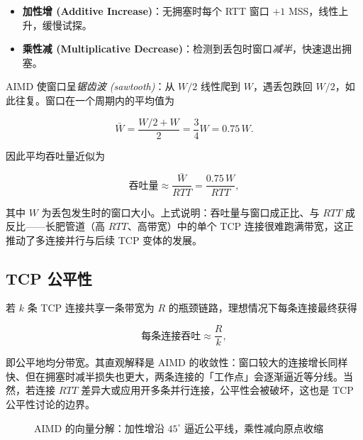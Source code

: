 \begin{itemize}
    \item \textbf{加性增 (Additive Increase)}：无拥塞时每个 RTT 窗口 $+1$ MSS，线性上升，缓慢试探。
    \item \textbf{乘性减 (Multiplicative Decrease)}：检测到丢包时窗口\emph{减半}，快速退出拥塞。
\end{itemize}

AIMD 使窗口呈\emph{锯齿波 (sawtooth)}：从 $W/2$ 线性爬到 $W$，遇丢包跌回 $W/2$，如此往复。窗口在一个周期内的平均值为

\[
\bar{W} = \frac{W/2 + W}{2} = \frac{3}{4}W = 0.75\,W.
\]

因此平均吞吐量近似为

\begin{equation}
    \text{吞吐量} \approx \frac{\bar{W}}{RTT} = \frac{0.75\,W}{RTT},
    \label{eq:throughput}
\end{equation}

其中 $W$ 为丢包发生时的窗口大小。上式说明：吞吐量与窗口成正比、与 $RTT$ 成反比——长肥管道（高 $RTT$、高带宽）中的单个 TCP 连接很难跑满带宽，这正推动了多连接并行与后续 TCP 变体的发展。

\subsection{TCP 公平性}

若 $k$ 条 TCP 连接共享一条带宽为 $R$ 的瓶颈链路，理想情况下每条连接最终获得

\begin{equation}
    \text{每条连接吞吐} \approx \frac{R}{k},
    \label{eq:fairness}
\end{equation}

即公平地均分带宽。其直观解释是 AIMD 的收敛性：窗口较大的连接增长同样快、但在拥塞时减半损失也更大，两条连接的「工作点」会逐渐逼近等分线。当然，若连接 $RTT$ 差异大或应用开多条并行连接，公平性会被破坏，这也是 TCP 公平性讨论的边界。

\begin{figure}[H]
\centering
{}
\caption{AIMD 的向量分解：加性增沿 $45^\circ$ 逼近公平线，乘性减向原点收缩}
\label{fig:fairness}
\end{figure}

